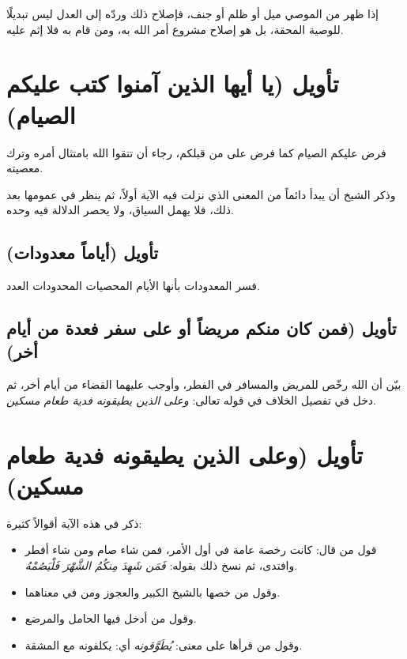 \begin{fawaid}
إذا ظهر من الموصي ميل أو ظلم أو جنف، فإصلاح ذلك وردّه إلى العدل ليس تبديلًا للوصية المحقة، بل هو إصلاح مشروع أمر الله به، ومن قام به فلا إثم عليه.
\end{fawaid}

\separator

\section{تأويل (يا أيها الذين آمنوا كتب عليكم الصيام)}
 فرض عليكم الصيام كما فرض على من قبلكم، رجاء أن تتقوا الله بامتثال أمره وترك معصيته.

وذكر الشيخ أن  يبدأ دائماً من المعنى الذي نزلت فيه الآية أولاً، ثم ينظر في عمومها بعد ذلك، فلا يهمل السياق، ولا يحصر الدلالة فيه وحده.

\subsection{تأويل (أياماً معدودات)}
فسر  المعدودات بأنها الأيام المحصيات المحدودات العدد.

\subsection{تأويل (فمن كان منكم مريضاً أو على سفر فعدة من أيام أخر)}
بيّن  أن الله رخّص للمريض والمسافر في الفطر، وأوجب عليهما القضاء من أيام أخر، ثم دخل في تفصيل الخلاف في قوله تعالى: \textit{وعلى الذين يطيقونه فدية طعام مسكين}.

\separator

\section{تأويل (وعلى الذين يطيقونه فدية طعام مسكين)}
ذكر  في هذه الآية أقوالاً كثيرة:
\begin{itemize}
    \item قول من قال: كانت رخصة عامة في أول الأمر، فمن شاء صام ومن شاء أفطر وافتدى، ثم نسخ ذلك بقوله: \textit{فَمَن شَهِدَ مِنكُمُ الشَّهْرَ فَلْيَصُمْهُ}.
    \item وقول من خصها بالشيخ الكبير والعجوز ومن في معناهما.
    \item وقول من أدخل فيها الحامل والمرضع.
    \item وقول من قرأها على معنى: \textit{يُطَوَّقونه} أي: يكلفونه مع المشقة.
\end{itemize}

